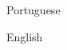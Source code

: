 

\begin{cvparagraph}
  \begin{svitems}
    \item {Portuguese}
    \item {English}
  \end{svitems}


\end{cvparagraph}
